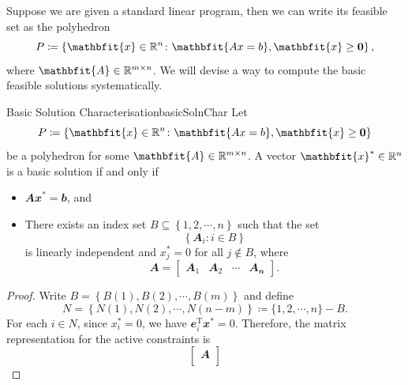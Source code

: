 \documentclass[math, code]{amznotes}
\theoremstyle{remark}
\begin{document}
Suppose we are given a standard linear program, then we can write its feasible set as the polyhedron
\begin{equation*}
    P \coloneqq \left\{\mathbfit{x} \in \R^n \colon \mathbfit{Ax = b}, \mathbfit{x} \geq \mathbf{0}\right\},
\end{equation*}
where $\mathbfit{A} \in \R^{m \times n}$. We will devise a way to compute the basic feasible solutions systematically.
\begin{thmbox}{Basic Solution Characterisation}{basicSolnChar}
    Let 
    \begin{equation*}
        P \coloneqq \left\{\mathbfit{x} \in \R^n \colon \mathbfit{Ax = b}, \mathbfit{x} \geq \mathbf{0}\right\}
    \end{equation*}
    be a polyhedron for some $\mathbfit{A} \in \R^{m \times n}$. A vector $\mathbfit{x}^* \in \R^n$ is a basic solution if and only if
    \begin{itemize}
        \item $\mathbfit{Ax}^* = \mathbfit{b}$, and
        \item There exists an index set $B \subseteq \left\{1, 2, \cdots, n\right\}$ such that the set
        \begin{equation*}
            \left\{\mathbfit{A}_i \colon i \in B\right\}
        \end{equation*}
        is linearly independent and $x^*_j = 0$ for all $j \notin B$, where
        \begin{equation*}
            \mathbfit{A} = \begin{bmatrix}
                \mathbfit{A_1} & \mathbfit{A_2} & \cdots & \mathbfit{A_n}
            \end{bmatrix}.
        \end{equation*}
    \end{itemize}
    \tcblower
    \begin{proof}
        Write $B = \left\{B(1), B(2), \cdots, B(m)\right\}$ and define 
        \begin{equation*}
            N = \left\{N(1), N(2), \cdots, N(n - m)\right\} \coloneqq \{1, 2, \cdots, n\} - B.
        \end{equation*}
        For each $i \in N$, since $x^*_i = 0$, we have $\mathbfit{e}^{\mathrm{T}}_i\mathbfit{x}^* = 0$. Therefore, the matrix representation for the active constraints is
        \begin{equation*}
            \begin{bmatrix}
                \mathbfit{A} \\

\end{bmatrix}
\end{equation*}
\end{proof}
\end{thmbox}
\end{document}
